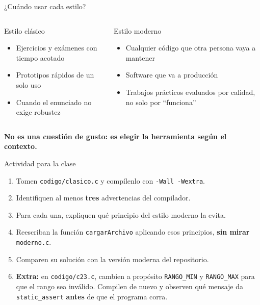 \documentclass[aspectratio=169]{beamer}
\begin{document}
\begin{frame}{¿Cuándo usar cada estilo?}
    \begin{columns}[T]
        \begin{block}{Estilo clásico}
            \begin{itemize}
                \item Ejercicios y exámenes con tiempo acotado
                \item Prototipos rápidos de un solo uso
                \item Cuando el enunciado no exige robustez
            \end{itemize}
        \end{block}

        \begin{block}{Estilo moderno}
            \begin{itemize}
                \item Cualquier código que otra persona vaya a mantener
                \item Software que va a producción
                \item Trabajos prácticos evaluados por calidad, no solo por ``funciona''
            \end{itemize}
        \end{block}
    \end{columns}

    \vspace{1em}
    \begin{center}
        \textbf{No es una cuestión de gusto: es elegir la herramienta según el contexto.}
    \end{center}
\end{frame}

\begin{frame}{Actividad para la clase}
    \begin{enumerate}
        \item Tomen \texttt{codigo/clasico.c} y compílenlo con \texttt{-Wall -Wextra}.
        \item Identifiquen al menos \textbf{tres} advertencias del compilador.
        \item Para cada una, expliquen qué principio del estilo moderno la evita.
        \item Reescriban la función \texttt{cargarArchivo} aplicando esos principios,
              \textbf{sin mirar} \texttt{moderno.c}.
        \item Comparen su solución con la versión moderna del repositorio.
        \item \textbf{Extra:} en \texttt{codigo/c23.c}, cambien a propósito
              \texttt{RANGO\_MIN} y \texttt{RANGO\_MAX} para que el rango sea
              inválido. Compilen de nuevo y observen qué mensaje da
              \texttt{static\_assert} \textbf{antes} de que el programa corra.
    \end{enumerate}
\end{frame}
\end{document}

